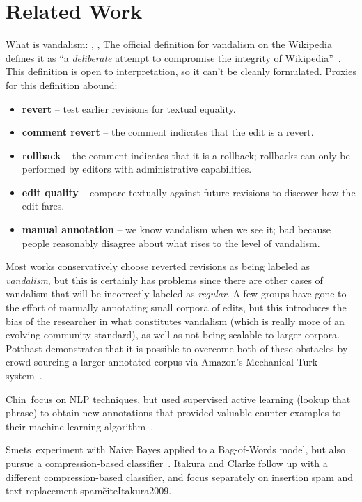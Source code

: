 \section{Related Work}

What is vandalism: \cite{wiki:vandalism}, \cite{Viegas2004},
\cite{Priedhorsky2007}
The official definition for vandalism on the Wikipedia defines it as
``a \textit{deliberate} attempt to compromise the integrity
of Wikipedia''~\cite{wiki:vandalism}.
This definition is open to interpretation, so it can't be cleanly
formulated.
Proxies for this definition abound:
\begin{itemize}
\item \textbf{revert} -- test earlier revisions for textual equality.
\item \textbf{comment revert} -- the comment indicates that the edit
    is a revert.
\item \textbf{rollback} -- the comment indicates that it is a
    rollback; rollbacks can only be performed by editors with
    administrative capabilities.
\item \textbf{edit quality} -- compare textually against future
    revisions to discover how the edit fares.
\item \textbf{manual annotation} -- we know vandalism when we see it;
    bad because people reasonably disagree about what rises to the
    level of vandalism.
\end{itemize}

Most works conservatively choose reverted revisions as being labeled
as \textit{vandalism}, but this is certainly has problems since there
are other cases of vandalism that will be incorrectly labeled as
\textit{regular}.
A few groups have gone to the effort of manually annotating small
corpora of edits, but this introduces the bias of the researcher in
what constitutes vandalism (which is really more of an evolving
community standard), as well as not being scalable to larger corpora.
Potthast demonstrates that it is possible to overcome both of these
obstacles by crowd-sourcing a larger annotated corpus via
Amazon's Mechanical Turk system~\cite{Potthast2010a}.

Chin~\etal focus on NLP techniques, but used supervised active
learning (lookup that phrase) to obtain new annotations that
provided valuable counter-examples to their machine learning
algorithm~\cite{Chin2010}.

Smets~\etal experiment with Naive Bayes applied to a Bag-of-Words
model, but also pursue a compression-based
classifier~\cite{Smets2008}.
Itakura and Clarke follow up with a different compression-based
classifier, and focus separately on insertion spam and
text replacement spam\~cite{Itakura2009}.

